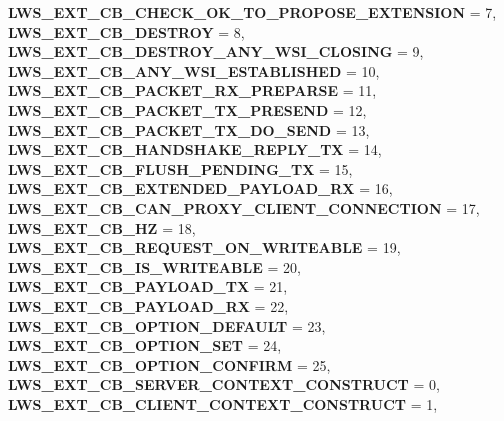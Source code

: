 \begin{DoxyCompactItemize}
{\bfseries L\+W\+S\+\_\+\+E\+X\+T\+\_\+\+C\+B\+\_\+\+C\+H\+E\+C\+K\+\_\+\+O\+K\+\_\+\+T\+O\+\_\+\+P\+R\+O\+P\+O\+S\+E\+\_\+\+E\+X\+T\+E\+N\+S\+I\+ON} = 7, 
{\bfseries L\+W\+S\+\_\+\+E\+X\+T\+\_\+\+C\+B\+\_\+\+D\+E\+S\+T\+R\+OY} = 8, 
{\bfseries L\+W\+S\+\_\+\+E\+X\+T\+\_\+\+C\+B\+\_\+\+D\+E\+S\+T\+R\+O\+Y\+\_\+\+A\+N\+Y\+\_\+\+W\+S\+I\+\_\+\+C\+L\+O\+S\+I\+NG} = 9, 
\newline
{\bfseries L\+W\+S\+\_\+\+E\+X\+T\+\_\+\+C\+B\+\_\+\+A\+N\+Y\+\_\+\+W\+S\+I\+\_\+\+E\+S\+T\+A\+B\+L\+I\+S\+H\+ED} = 10, 
{\bfseries L\+W\+S\+\_\+\+E\+X\+T\+\_\+\+C\+B\+\_\+\+P\+A\+C\+K\+E\+T\+\_\+\+R\+X\+\_\+\+P\+R\+E\+P\+A\+R\+SE} = 11, 
{\bfseries L\+W\+S\+\_\+\+E\+X\+T\+\_\+\+C\+B\+\_\+\+P\+A\+C\+K\+E\+T\+\_\+\+T\+X\+\_\+\+P\+R\+E\+S\+E\+ND} = 12, 
{\bfseries L\+W\+S\+\_\+\+E\+X\+T\+\_\+\+C\+B\+\_\+\+P\+A\+C\+K\+E\+T\+\_\+\+T\+X\+\_\+\+D\+O\+\_\+\+S\+E\+ND} = 13, 
\newline
{\bfseries L\+W\+S\+\_\+\+E\+X\+T\+\_\+\+C\+B\+\_\+\+H\+A\+N\+D\+S\+H\+A\+K\+E\+\_\+\+R\+E\+P\+L\+Y\+\_\+\+TX} = 14, 
{\bfseries L\+W\+S\+\_\+\+E\+X\+T\+\_\+\+C\+B\+\_\+\+F\+L\+U\+S\+H\+\_\+\+P\+E\+N\+D\+I\+N\+G\+\_\+\+TX} = 15, 
{\bfseries L\+W\+S\+\_\+\+E\+X\+T\+\_\+\+C\+B\+\_\+\+E\+X\+T\+E\+N\+D\+E\+D\+\_\+\+P\+A\+Y\+L\+O\+A\+D\+\_\+\+RX} = 16, 
{\bfseries L\+W\+S\+\_\+\+E\+X\+T\+\_\+\+C\+B\+\_\+\+C\+A\+N\+\_\+\+P\+R\+O\+X\+Y\+\_\+\+C\+L\+I\+E\+N\+T\+\_\+\+C\+O\+N\+N\+E\+C\+T\+I\+ON} = 17, 
\newline
{\bfseries L\+W\+S\+\_\+\+E\+X\+T\+\_\+\+C\+B\+\_\+HZ} = 18, 
{\bfseries L\+W\+S\+\_\+\+E\+X\+T\+\_\+\+C\+B\+\_\+\+R\+E\+Q\+U\+E\+S\+T\+\_\+\+O\+N\+\_\+\+W\+R\+I\+T\+E\+A\+B\+LE} = 19, 
{\bfseries L\+W\+S\+\_\+\+E\+X\+T\+\_\+\+C\+B\+\_\+\+I\+S\+\_\+\+W\+R\+I\+T\+E\+A\+B\+LE} = 20, 
{\bfseries L\+W\+S\+\_\+\+E\+X\+T\+\_\+\+C\+B\+\_\+\+P\+A\+Y\+L\+O\+A\+D\+\_\+\+TX} = 21, 
\newline
{\bfseries L\+W\+S\+\_\+\+E\+X\+T\+\_\+\+C\+B\+\_\+\+P\+A\+Y\+L\+O\+A\+D\+\_\+\+RX} = 22, 
{\bfseries L\+W\+S\+\_\+\+E\+X\+T\+\_\+\+C\+B\+\_\+\+O\+P\+T\+I\+O\+N\+\_\+\+D\+E\+F\+A\+U\+LT} = 23, 
{\bfseries L\+W\+S\+\_\+\+E\+X\+T\+\_\+\+C\+B\+\_\+\+O\+P\+T\+I\+O\+N\+\_\+\+S\+ET} = 24, 
{\bfseries L\+W\+S\+\_\+\+E\+X\+T\+\_\+\+C\+B\+\_\+\+O\+P\+T\+I\+O\+N\+\_\+\+C\+O\+N\+F\+I\+RM} = 25, 
\newline
{\bfseries L\+W\+S\+\_\+\+E\+X\+T\+\_\+\+C\+B\+\_\+\+S\+E\+R\+V\+E\+R\+\_\+\+C\+O\+N\+T\+E\+X\+T\+\_\+\+C\+O\+N\+S\+T\+R\+U\+CT} = 0, 
{\bfseries L\+W\+S\+\_\+\+E\+X\+T\+\_\+\+C\+B\+\_\+\+C\+L\+I\+E\+N\+T\+\_\+\+C\+O\+N\+T\+E\+X\+T\+\_\+\+C\+O\+N\+S\+T\+R\+U\+CT} = 1, 

\end{DoxyCompactItemize}
